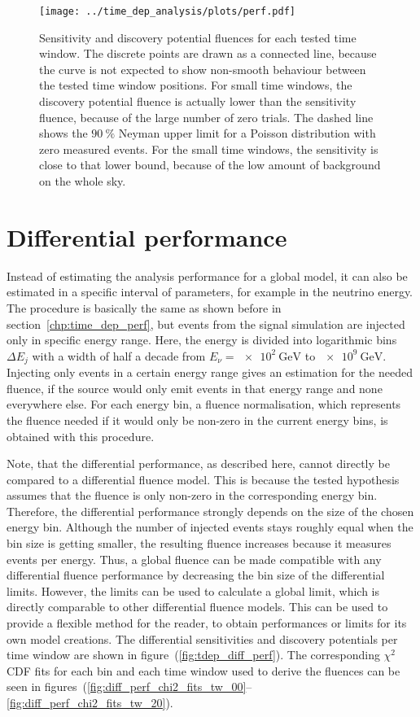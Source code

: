 \begin{figure}[htbp]
  \centering
  \texttt{[image: ../time\_dep\_analysis/plots/perf.pdf]}
  \caption[Performance fluences for each time window]{
    Sensitivity and discovery potential fluences for each tested time window.
    The discrete points are drawn as a connected line, because the curve is not expected to show non-smooth behaviour between the tested time window positions.
    For small time windows, the discovery potential fluence is actually lower than the sensitivity fluence, because of the large number of zero trials.
    The dashed line shows the $\SI{90}{\percent}$ Neyman upper limit for a Poisson distribution with zero measured events.
    For the small time windows, the sensitivity is close to that lower bound, because of the low amount of background on the whole sky.
  }
  \label{fig:tdep_perf}
\end{figure}


\section{Differential performance}
  \label{chp:time_dep_diff_perf}
Instead of estimating the analysis performance for a global model, it can also be estimated in a specific interval of parameters, for example in the neutrino energy.
The procedure is basically the same as shown before in section~\ref{chp:time_dep_perf}, but events from the signal simulation are injected only in specific energy range.
Here, the energy is divided into logarithmic bins $\Delta E_j$ with a width of half a decade from $E_\nu = \SI{e2}{\GeV}$ to $\SI{e9}{\GeV}$.
Injecting only events in a certain energy range gives an estimation for the needed fluence, if the source would only emit events in that energy range and none everywhere else.
For each energy bin, a fluence normalisation, which represents the fluence needed if it would only be non-zero in the current energy bins, is obtained with this procedure.

Note, that the differential performance, as described here, cannot directly be compared to a differential fluence model.
This is because the tested hypothesis assumes that the fluence is only non-zero in the corresponding energy bin.
Therefore, the differential performance strongly depends on the size of the chosen energy bin.
Although the number of injected events stays roughly equal when the bin size is getting smaller, the resulting fluence increases because it measures events per energy.
Thus, a global fluence can be made compatible with any differential fluence performance by decreasing the bin size of the differential limits.
However, the limits can be used to calculate a global limit, which is directly comparable to other differential fluence models.
This can be used to provide a flexible method for the reader, to obtain performances or limits for its own model creations.
The differential sensitivities and discovery potentials per time window are shown in figure~(\ref{fig:tdep_diff_perf}).
The corresponding $\chi^2$ CDF fits for each bin and each time window used to derive the fluences can be seen in figures~(\ref{fig:diff_perf_chi2_fits_tw_00}--\ref{fig:diff_perf_chi2_fits_tw_20}).

